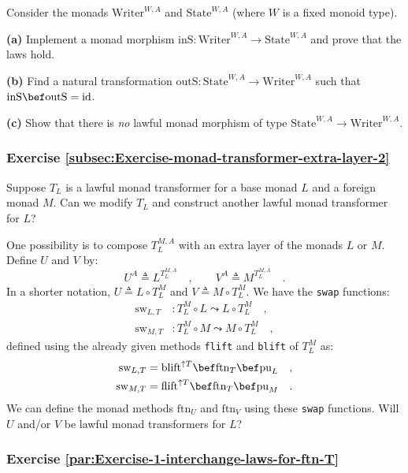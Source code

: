 Consider the monads $\text{Writer}^{W,A}$ and $\text{State}^{W,A}$
(where $W$ is a fixed monoid type).

\textbf{(a)} Implement a monad morphism $\text{inS}:\text{Writer}^{W,A}\rightarrow\text{State}^{W,A}$
and prove that the laws hold.

\textbf{(b)} Find a natural transformation $\text{outS}:\text{State}^{W,A}\rightarrow\text{Writer}^{W,A}$
such that $\text{inS}\bef\text{outS}=\text{id}$.

\textbf{(c)} Show that there is \emph{no} lawful monad morphism of
type $\text{State}^{W,A}\rightarrow\text{Writer}^{W,A}$.

\subsubsection{Exercise \label{subsec:Exercise-monad-transformer-extra-layer-2}\ref{subsec:Exercise-monad-transformer-extra-layer-2} }

Suppose $T_{L}$ is a lawful monad transformer for a base monad $L$
and a foreign monad $M$. Can we modify $T_{L}$ and construct another
lawful monad transformer for $L$?

One possibility is to compose $T_{L}^{M,A}$ with an extra layer of
the monads $L$ or $M$. Define $U$ and $V$ by:
\[
U^{A}\triangleq L^{T_{L}^{M,A}}\quad,\quad\quad V^{A}\triangleq M^{T_{L}^{M,A}}\quad.
\]
In a shorter notation, $U\triangleq L\circ T_{L}^{M}$ and $V\triangleq M\circ T_{L}^{M}$.
We have the \lstinline!swap! functions:
\begin{align*}
\text{sw}_{L,T} & :T_{L}^{M}\circ L\leadsto L\circ T_{L}^{M}\quad,\\
\text{sw}_{M,T} & :T_{L}^{M}\circ M\leadsto M\circ T_{L}^{M}\quad,
\end{align*}
defined using the already given methods \lstinline!flift! and \lstinline!blift!
of $T_{L}^{M}$ as:
\begin{align*}
\text{sw}_{L,T} & =\text{blift}^{\uparrow T}\bef\text{ftn}_{T}\bef\text{pu}_{L}\quad,\\
\text{sw}_{M,T} & =\text{flift}^{\uparrow T}\bef\text{ftn}_{T}\bef\text{pu}_{M}\quad.
\end{align*}
We can define the monad methods $\text{ftn}_{U}$ and $\text{ftn}_{V}$
using these \lstinline!swap! functions. Will $U$ and/or $V$ be
lawful monad transformers for $L$? 

\subsubsection{Exercise \label{par:Exercise-1-interchange-laws-for-ftn-T}\ref{par:Exercise-1-interchange-laws-for-ftn-T}}

